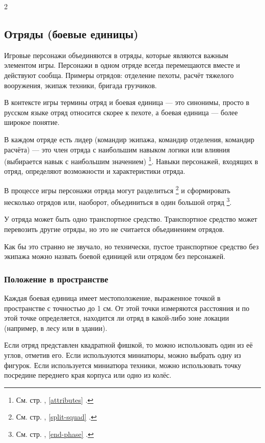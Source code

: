 \documentclass[twoside]{article}
\begin{document}
\begin{multicols}{2}
\subsection{Отряды (боевые единицы)}\label{squads}

Игровые персонажи объединяются в отряды, которые являются важным
элементом игры. Персонажи в одном отряде всегда перемещаются вместе и
действуют сообща. Примеры отрядов: отделение пехоты, расчёт тяжелого
вооружения, экипаж техники, бригада грузчиков.

В контексте игры термины отряд и боевая единица --- это синонимы, просто
в русском языке отряд относится скорее к пехоте, а боевая единица ---
более широкое понятие.

В каждом отряде есть лидер (командир экипажа, командир отделения,
командир расчёта) --- это член отряда с наибольшим навыком логики или
влияния (выбирается навык с наибольшим значением)
\footnote{См. стр. \pageref{attributes}, \ref{attributes} .}.
Навыки персонажей, входящих в отряд, определяют возможности и характеристики отряда.

В процессе игры персонажи отряда могут разделиться
\footnote{См. стр. \pageref{split-squad}, \ref{split-squad} .}
и сформировать несколько отрядов или, наоборот, объединиться в один большой отряд
\footnote{См. стр. \pageref{end-phase}, \ref{end-phase} .}.

У отряда может быть одно транспортное средство. Транспортное средство
может перевозить другие отряды, но это не считается объединением
отрядов.

Как бы это странно не звучало, но технически, пустое транспортное
средство без экипажа можно назвать боевой единицей или отрядом без
персонажей.

\subsubsection{Положение в пространстве}\label{position}

Каждая боевая единица имеет местоположение, выраженное точкой в
пространстве с точностью до 1 см. От этой точки измеряются расстояния и
по этой точке определяется, находится ли отряд в какой-либо зоне локации
(например, в лесу или в здании).

Если отряд представлен квадратной фишкой, то можно использовать один из
её углов, отметив его. Если используются миниатюры, можно выбрать одну
из фигурок. Если используется миниатюра техники, можно использовать
точку посредине переднего края корпуса или одно из колёс.


\end{multicols}
\end{document}
